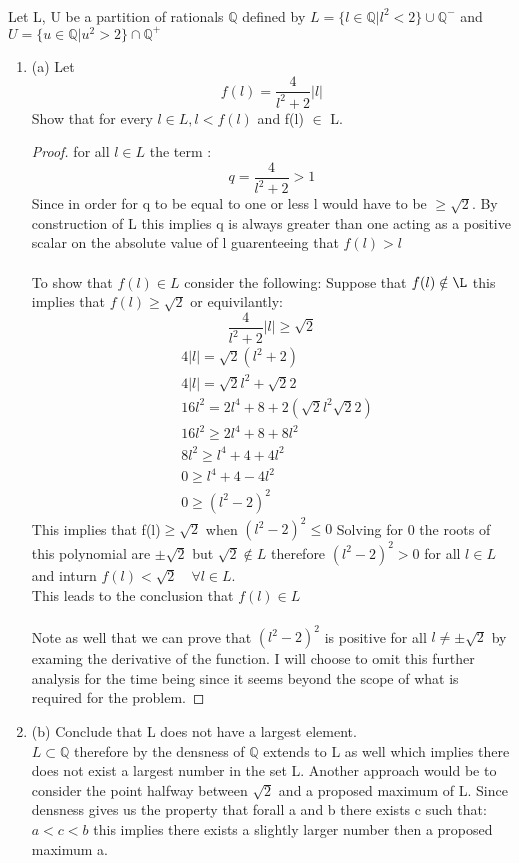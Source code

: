 \documentclass[11pt]{article}
\theoremstyle{definition}  %
\newcommand{\Q}{\mathbb{Q}}
\begin{document}
\\
Let {L, U} be a partition of rationals $\Q$ defined by $L = \{l \in \Q|l^2 < 2\}\cup \Q^-$
and $U = \{u \in \Q|u^
2 > 2\} \cap \Q^+$
\begin{enumerate}

  \item (a) Let
  \[
    f(l)=\frac{4}{l^2+2}|l|
  \] Show that for every $l \in  L, l < f(l)$ and f(l) $\in$ L.
\begin{proof}
  for all $l \in L$ the term : \
  \[
    q=\frac{4}{l^2+2}>1
  \]
  Since in order for q to be equal to one or less l would have to be $\geq \sqrt{2}$. By construction of L this implies q is always greater than one acting as a positive scalar on the absolute value of l guarenteeing that $f(l)>l$\\\\
  To show that $f(l)\in L$ consider the following: Suppose that $f(l)\notin \L$ this implies that $f(l) \geq \sqrt{2}$ or equivilantly:
  \[
    \frac{4}{l^2+2}|l|\geq \sqrt{2}
  \]
  \begin{align*}
    &4|l|=\sqrt{2}(l^2+2)\\
    &4|l|=\sqrt{2}l^2+\sqrt{2}2\\
    &16l^2=2l^4+8+2(\sqrt{2}l^2\sqrt{2}2)\\
    &16l^2\geq 2l^4+8+8l^2\\
    &8l^2\geq l^4+4+4l^2\\
    &0\geq l^4+4-4l^2\\
    &0\geq (l^2-2)^2
  \end{align*}
  This implies that f(l)$\geq \sqrt{2}$ when $(l^2-2)^2\leq 0$ Solving for 0 the roots of this polynomial are $\pm\sqrt{2}$ but $\sqrt{2} \notin L$ therefore $(l^2-2)^2>0 $ for all $l\in L$ and inturn $f(l) < \sqrt{2}\quad  \forall l\in L $.\\
  This leads to the conclusion that $f(l)\in L$\\\\ Note as well that we can prove that $(l^2-2)^2$ is positive for all $l\neq \pm \sqrt{2}$ by examing the derivative of the function. I will choose to omit this further analysis for the time being since it seems beyond the scope of what is required for the problem.
\end{proof}
  \item (b) Conclude that L does not have a largest element.\\
  $L\subset \mathbb{Q}$ therefore by the densness of $\Q$ extends to L as well which implies there does not exist a largest number in the set L. Another approach would be to consider the point halfway between $\sqrt{2}$ and a proposed maximum of L. Since densness gives us the property that forall a and b there exists c such that: $a<c<b$ this implies there exists a slightly larger number then a proposed maximum a.

\end{enumerate}
\end{document}
